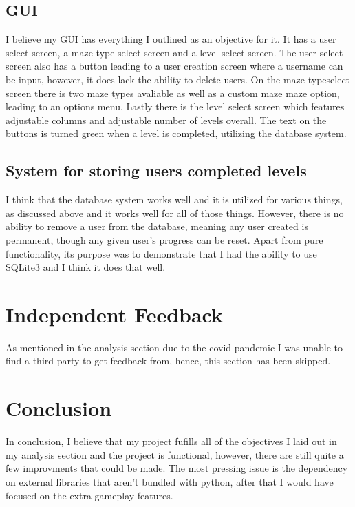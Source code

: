 \documentclass{article}
\begin{document}
\subsection{GUI}
I believe my GUI has everything I outlined as an objective for it. It has a user select screen, a maze type select screen and a level select screen. The user select screen also has a button leading to a user creation screen where a username can be input, however, it does lack the ability to delete users. On the maze typeselect screen there is two maze types avaliable as well as a custom
 maze maze option, leading to an options menu. Lastly there is the level select screen which features adjustable columns and adjustable number of levels overall. The text on the buttons is 
turned green when a level is completed, utilizing the database system.

\subsection{System for storing users completed levels}
I think that the database system works well and it is utilized for various things, as discussed above and it works well for all of those things. However, there is no ability to remove a user from the database, meaning any user created is permanent, though any given user's progress can be reset. Apart from pure functionality, its purpose was to demonstrate that I had the ability to use
SQLite3 and I think it does that well.
\clearpage

\section{Independent Feedback}
As mentioned in the analysis section due to the covid pandemic I was unable to find a third-party to get feedback from, hence, this section has been skipped.
\section{Conclusion}
In conclusion, I believe that my project fufills all of the objectives I laid out in my analysis section and the project is functional, however, there are still quite a few improvments that could be
made. The most pressing issue is the dependency on external libraries that aren't bundled with python, after that I would have focused on the extra gameplay features. 

\end{document}
